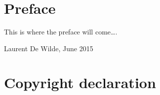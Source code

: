 \chapter{Preface}

\begin{slshape}
\renewcommand{\baselinestretch}{1.2}
\small\normalsize

\npar This is where the preface will come\ldots .






\addvspace{4cm}

\noindent Laurent De Wilde, June 2015
\end{slshape}

\chapter{Copyright declaration}

